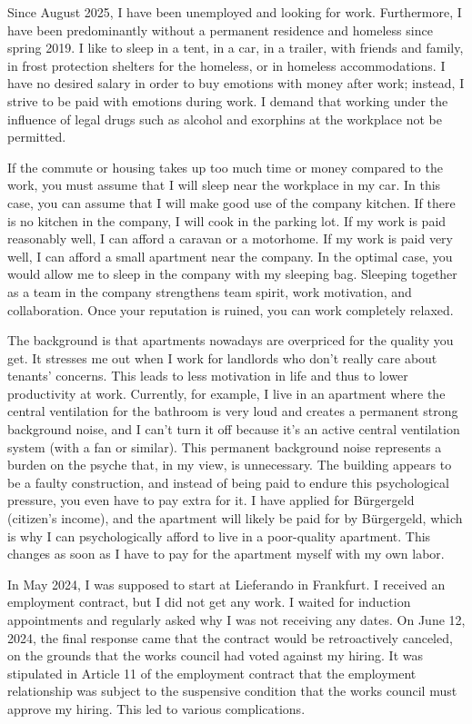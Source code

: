 \versionLanguageStart%
		Since August 2025, I have been unemployed and looking for work.  
		Furthermore, I have been predominantly without a permanent residence and homeless since spring 2019.  
		I like to sleep in a tent, in a car, in a trailer, with friends and family, in frost protection shelters for the homeless, or in homeless accommodations.  
		I have no desired salary in order to buy emotions with money after work; instead, I strive to be paid with emotions during work.  
		I demand that working under the influence of legal drugs such as alcohol and exorphins at the workplace not be permitted.

		If the commute or housing takes up too much time or money compared to the work, you must assume that I will sleep near the workplace in my car.  
		In this case, you can assume that I will make good use of the company kitchen.  
		If there is no kitchen in the company, I will cook in the parking lot.  
		If my work is paid reasonably well, I can afford a caravan or a motorhome.  
		If my work is paid very well, I can afford a small apartment near the company.  
		In the optimal case, you would allow me to sleep in the company with my sleeping bag.  
		Sleeping together as a team in the company strengthens team spirit, work motivation, and collaboration.  
		Once your reputation is ruined, you can work completely relaxed.

		The background is that apartments nowadays are overpriced for the quality you get.  
		It stresses me out when I work for landlords who don't really care about tenants' concerns.  
		This leads to less motivation in life and thus to lower productivity at work.  
		Currently, for example, I live in an apartment where the central ventilation for the bathroom is very loud and creates a permanent strong background noise, and I can't turn it off because it's an active central ventilation system (with a fan or similar).  
		This permanent background noise represents a burden on the psyche that, in my view, is unnecessary.  
		The building appears to be a faulty construction, and instead of being paid to endure this psychological pressure, you even have to pay extra for it.  
		I have applied for Bürgergeld (citizen's income), and the apartment will likely be paid for by Bürgergeld, which is why I can psychologically afford to live in a poor-quality apartment.  
		This changes as soon as I have to pay for the apartment myself with my own labor.

		In May 2024, I was supposed to start at Lieferando in Frankfurt.  
		I received an employment contract, but I did not get any work.  
		I waited for induction appointments and regularly asked why I was not receiving any dates.  
		On June 12, 2024, the final response came that the contract would be retroactively canceled, on the grounds that the works council had voted against my hiring.  
		It was stipulated in Article 11 of the employment contract that the employment relationship was subject to the suspensive condition that the works council must approve my hiring.  
		This led to various complications.

